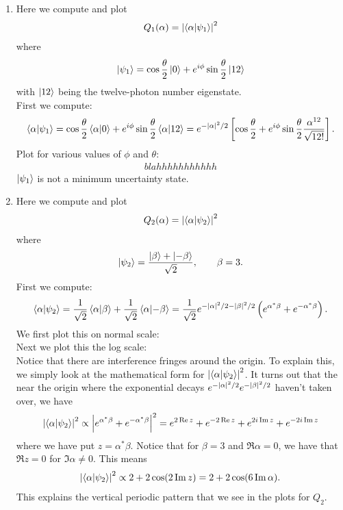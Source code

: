 \documentclass{article}
\theoremstyle{definition}
\newcommand{\al}{\alpha}
\newcommand{\be}{\beta}
\newcommand{\f}[2]{\frac{#1}{#2}}
\newcommand{\lp}{\left(}
\newcommand{\rp}{\right)}
\newcommand{\lb}{\left[}
\newcommand{\rb}{\right]}
\begin{document}
\begin{enumerate}[label=\alph*)]
	\item Here we compute and plot 
	\begin{align*}
		Q_1(\al) = \abs{\braket{\al}{\psi_1}}^2
	\end{align*}
	where
	\begin{align*}
		\ket{\psi_1} = \cos \f{\theta}{2} \ket{0} + e^{i\phi} \sin\f{\theta}{2}\ket{12}
	\end{align*}
	with $\ket{12}$ being the twelve-photon number eigenstate. \\
	
	
	First we compute:
	\begin{align*}
		\braket{\al}{\psi_1} = \cos\f{\theta}{2} \braket{\al}{0} + e^{i\phi}\sin\f{\theta}{2} \braket{\al}{12} = e^{-\abs{\al}^2/2}\lb \cos\f{\theta}{2}  + e^{i\phi} \sin\f{\theta}{2} \f{\al^{12}}{\sqrt{12!}} \rb.
	\end{align*}
	Plot for various values of $\phi$ and $\theta$:
	\begin{align*}
		blahhhhhhhhhhh
	\end{align*}
	$\ket{\psi_1}$ is not a minimum uncertainty state. 
	
	\item Here we compute and plot 
	\begin{align*}
		Q_2(\al) = \abs{\braket{\al}{\psi_2}}^2
	\end{align*}
	where
	\begin{align*}
		\ket{\psi_2} = \f{\ket{\be} + \ket{-\be}}{\sqrt{2}}, \quad\quad \be = 3.
	\end{align*}
	First we compute:
	\begin{align*}
		\braket{\al}{\psi_2} = \f{1}{\sqrt{2}} \braket{\al}{\be} + \f{1}{\sqrt{2}}\braket{\al}{-\be} = \f{1}{\sqrt{2}} e^{-\abs{\al}^2/2-\abs{\be}^2/2} \lp  e^{\al^* \be} + e^{-\al^* \be} \rp.
	\end{align*}
	We first plot this on normal scale:\\
	
	
	\noindent Next we plot this the log scale: \\
	
	\noindent Notice that there are interference fringes around the origin. To explain this, we simply look at the mathematical form for $\abs{\braket{\al}{\psi_2}}^2$. It turns out that the near the origin where the exponential decays $e^{-\abs{\al}^2/2} e^{-\abs{\be}^2/2}$ haven't taken over, we have
	\begin{align*}
		\abs{\braket{\al}{\psi_2}}^2 \propto \abs{e^{\al^*\be} + e^{-\al^*\be}}^2 = e^{2\Re z}+ e^{-2\Re z} + e^{2i \Im z} + e^{-2i \Im z}
	\end{align*}
	where we have put $z = \al^*\be$. Notice that for $\be = 3$ and $\Re \al = 0$, we have that $\Re z =0$ for $\Im \al \neq 0$. This means 
	\begin{align*}
			\abs{\braket{\al}{\psi_2}}^2 \propto 2 + 2\cos(2\Im z) = 2 + 2\cos(6 \Im \al).
	\end{align*}
	This explains the vertical periodic pattern that we see in the plots for $Q_2$. 


\end{enumerate}
\end{document}
